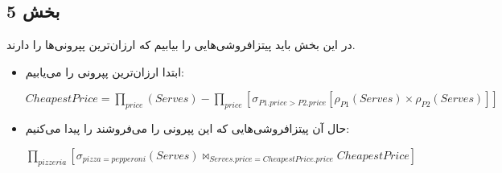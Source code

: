 \subsection*{بخش 5}
در این بخش باید پیتزافروشی‌هایی را بیابیم که ارزان‌ترین پپرونی‌ها را دارند.
\begin{itemize}
	\item ابتدا ارزان‌ترین پپرونی را می‌یابیم:
	
	\setLTR
	$CheapestPrice = \prod_{price}(Serves) - \prod_{price}[\sigma_{P1.price>P2.price}[\rho_{P1}(Serves)\times\rho_{P2}(Serves)]]$
	\setRTL
	
	\item حال آن پیتزافروشی‌هایی که این پپرونی را می‌فروشند را پیدا می‌کنیم:
	
	\setLTR
	
	$\prod_{pizzeria}[\sigma_{pizza=pepperoni}(Serves)\bowtie_{Serves.price = CheapestPrice.price}CheapestPrice]$
	\setRTL
\end{itemize}